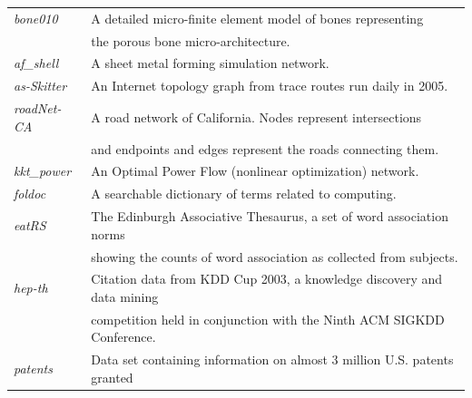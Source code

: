 \begin{table}[!h]
\begin{tabular}{ll}
{\it bone010} \cite{vanRietbergen199569} &
A detailed micro-finite element model of bones representing \\
& the porous bone micro-architecture. \\ \hline
{\it af\_shell} \cite{Davis97theuniversity}  & A sheet metal forming simulation network. \\ \hline
{\it as-Skitter} \cite{Leskovec:2005:GOT:1081870.1081893} & An Internet topology graph from trace routes run daily in 2005. \\ \hline %
{\it roadNet-CA} \cite{Leskovec:2005:GOT:1081870.1081893} & A road network of California.
Nodes represent intersections \\ & and endpoints and edges represent the roads connecting them. \\ \hline %
{\it kkt\_power} \cite{Davis97theuniversity} & An Optimal Power Flow (nonlinear optimization) network. \\\hline
{\it foldoc} \cite{foldoc} & A searchable dictionary of terms related to computing. \\\hline
{\it eatRS} \cite{eatRS} & The Edinburgh Associative Thesaurus, a set of word association norms \\
& showing the counts of word association as collected from subjects. \\\hline
{\it hep-th} \cite{hep-th-kdd}	& Citation data from KDD Cup 2003, a knowledge discovery and data mining\\
& competition held in conjunction with the Ninth ACM SIGKDD Conference. \\\hline
{\it patents} \cite{hall2001}	& Data set containing information on almost 3 million U.S. patents granted\\

\end{tabular}
\end{table}

